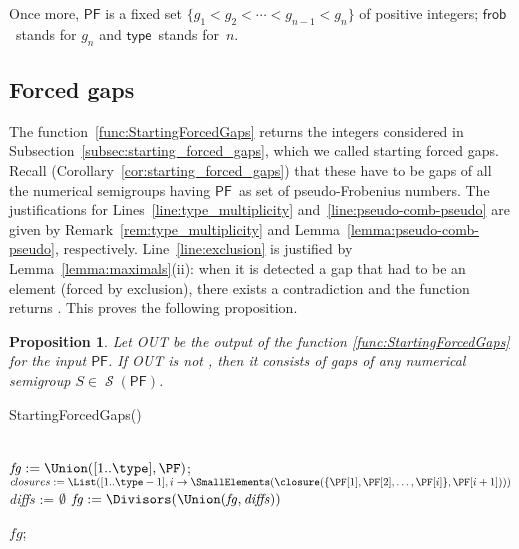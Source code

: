 \documentclass[11pt]{amsart}
\newtheorem{proposition}[theorem]{Proposition}
\theoremstyle{remark}
\begin{document}
Once more, ${\ensuremath{\mathsf{PF}}}$ is a fixed set $\{g_1<g_2<\cdots<g_{n-1}<g_n\}$ of positive integers; {\ensuremath{\mathsf{frob}}}\ stands for $g_n$ and {\ensuremath{\mathsf{type}}}\ stands for~$n$.

\subsection{Forced gaps}
\label{subsec:forced_gaps_pseudo_code}
The function~\ref{func:StartingForcedGaps} returns the integers considered in Subsection~\ref{subsec:starting_forced_gaps}, which we called starting forced gaps. Recall (Corollary~\ref{cor:starting_forced_gaps}) that these have to be gaps of all the numerical semigroups having {\ensuremath{\mathsf{PF}}}\ as set of pseudo-Frobenius numbers.
The justifications for Lines~\ref{line:type_multiplicity} and~\ref{line:pseudo-comb-pseudo} are given by Remark~\ref{rem:type_multiplicity} and Lemma~\ref{lemma:pseudo-comb-pseudo}, respectively.
Line~\ref{line:exclusion} is justified by Lemma~\ref{lemma:maximals}(ii): when it is detected a gap that had to be an element (forced by exclusion), there exists a contradiction and the function returns \fail.
This proves the following proposition.
\begin{proposition}\label{prop:correction_StartingForcedGaps}
Let \textsf{OUT} be the output of the function \ref{func:StartingForcedGaps} for the input {\ensuremath{\mathsf{PF}}}. If \textsf{OUT} is not \fail, then it consists of gaps of any numerical semigroup $S\in \operatorname{\mathcal{S}}({\ensuremath{\mathsf{PF}}})$.
\end{proposition}
\begin{function}[ht]\caption{StartingForcedGaps()\label{func:StartingForcedGaps}}
\StartingForcedGapsw{\PF}\\
\nl\label{line:type_multiplicity}
  $\mathit{fg} := \Union([1..\type],\PF)$; \\
  $closures := \List([1..\type-1], i\to \SmallElements(\closure(\{\PF[1],\PF[2],\ldots,\PF[i]\},\PF[i+1])))$\;
  \emph{diffs} := $\emptyset$\;
\nl\label{line:pseudo-comb-pseudo}
$\mathit{fg} :=\Divisors(\Union(\mathit{fg},\mathit{diffs}))$\;

\nl\label{line:exclusion}
\Return $\mathit{fg}$;
\end{function}
\end{document}
